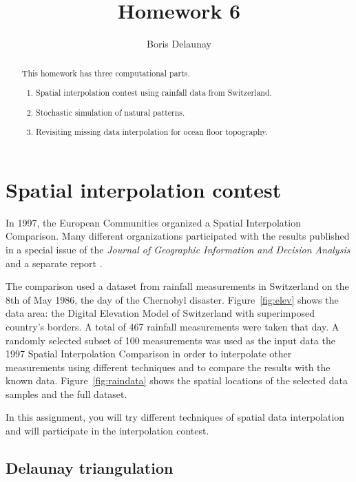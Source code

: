 \author{Boris Delaunay}
\title{Homework 6}

\begin{abstract}
  This homework has three computational parts. 
  \begin{enumerate}
  \item Spatial interpolation contest using rainfall data from Switzerland.
  \item Stochastic simulation of natural patterns.
  \item Revisiting missing data interpolation for ocean floor topography.
  \end{enumerate}
\end{abstract}

\section{Spatial interpolation contest}

In 1997, the European Communities organized a Spatial Interpolation
Comparison. Many different organizations participated with the results
published in a special issue of the \emph{Journal of Geographic
Information and Decision Analysis} \cite[]{dubois} and a separate
report \cite[]{rain}.


The comparison used a dataset from rainfall measurements in
Switzerland on the 8th of May 1986, the day of the Chernobyl disaster.
Figure~\ref{fig:elev} shows the data area: the Digital Elevation Model
of Switzerland with superimposed country's borders.  A total of 467
rainfall measurements were taken that day. A randomly selected subset
of 100 measurements was used as the input data the 1997 Spatial
Interpolation Comparison in order to interpolate other measurements
using different techniques and to compare the results with the known
data. Figure~\ref{fig:raindata} shows the spatial locations of the
selected data samples and the full dataset.


In this assignment, you will try different techniques of spatial data
interpolation and will participate in the interpolation contest.

\subsection{Delaunay triangulation}

